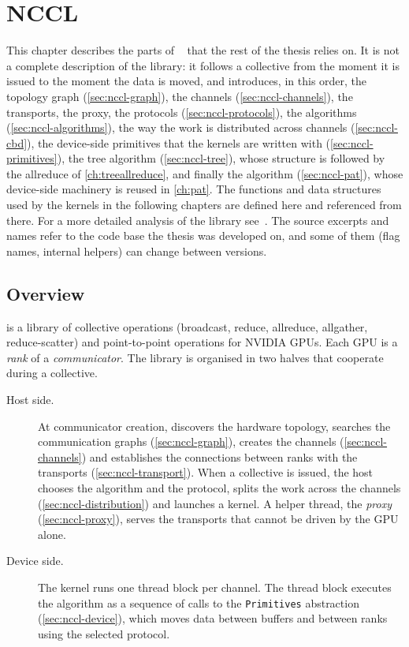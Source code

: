 \chapter{NCCL}\label{ch:nccl}

This chapter describes the parts of \nccl{}~\cite{nccl} that the rest of the thesis relies on.
It is not a complete description of the library: it follows a collective from the moment it is issued to the moment the data is moved, and introduces, in this order, the topology graph (\cref{sec:nccl-graph}), the channels (\cref{sec:nccl-channels}), the transports, the proxy, the protocols (\cref{sec:nccl-protocols}), the algorithms (\cref{sec:nccl-algorithms}), the way the work is distributed across channels (\cref{sec:nccl-cbd}), the device-side primitives that the kernels are written with (\cref{sec:nccl-primitives}), the tree algorithm (\cref{sec:nccl-tree}), whose structure is followed by the allreduce of \cref{ch:treeallreduce}, and finally the \pat{} algorithm (\cref{sec:nccl-pat}), whose device-side machinery is reused in \cref{ch:pat}.
The functions and data structures used by the \bine{} kernels in the following chapters are defined here and referenced from there.
For a more detailed analysis of the library see~\cite{hu2025demystifying}.
The source excerpts and names refer to the \nccl{} code base the thesis was developed on, and some of them (flag names, internal helpers) can change between versions.

\section{Overview}\label{sec:nccl-overview}

\nccl{} is a library of collective operations (broadcast, reduce, allreduce, allgather, reduce-scatter) and point-to-point operations for NVIDIA GPUs.
Each GPU is a \emph{rank} of a \emph{communicator}.
The library is organised in two halves that cooperate during a collective.

\begin{description}
  \item[Host side.] At communicator creation, \nccl{} discovers the hardware topology, searches the communication graphs (\cref{sec:nccl-graph}), creates the channels (\cref{sec:nccl-channels}) and establishes the connections between ranks with the transports (\cref{sec:nccl-transport}).
  When a collective is issued, the host chooses the algorithm and the protocol, splits the work across the channels (\cref{sec:nccl-distribution}) and launches a kernel.
  A helper thread, the \emph{proxy} (\cref{sec:nccl-proxy}), serves the transports that cannot be driven by the GPU alone.
  \item[Device side.] The kernel runs one thread block per channel.
  The thread block executes the algorithm as a sequence of calls to the \texttt{Primitives} abstraction (\cref{sec:nccl-device}), which moves data between buffers and between ranks using the selected protocol.
\end{description}

